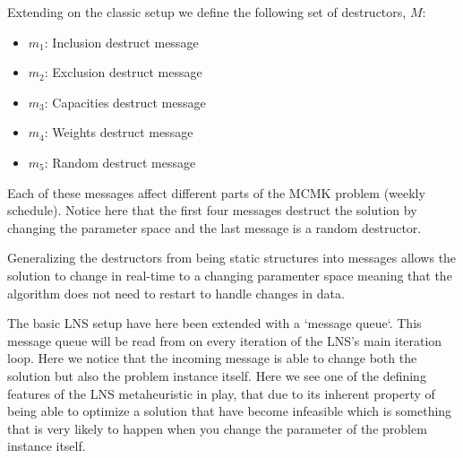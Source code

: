 \documentclass[preprint,12pt,authoryear]{elsarticle}
\begin{document}
Extending on the classic setup we define the following set of destructors, $M$:

\begin{itemize}
	\item $m_1$: Inclusion destruct message	
	\item $m_2$: Exclusion destruct message	
	\item $m_3$: Capacities destruct message	
	\item $m_4$: Weights destruct message	
	\item $m_5$: Random destruct message
\end{itemize}

Each of these messages affect different parts of the MCMK problem (weekly schedule). Notice
here that the first four messages destruct the solution by changing the parameter space and the last message is 
a random destructor.

Generalizing the destructors from being static structures into messages
allows the solution to change in real-time to a changing paramenter space meaning
that the algorithm does not need to restart to handle changes in data. 


	

The basic LNS setup have here been extended with a `message queue`. This message queue will be read from on every iteration of the LNS's main iteration loop. Here we notice that the 
incoming message is able to change both the solution but also the problem instance itself. Here we see one of the defining features of the LNS metaheuristic in play, that due to its inherent property of being able to optimize a solution that have become infeasible which is something that is very likely to happen when you change the parameter of the problem instance itself. 
\end{document}
